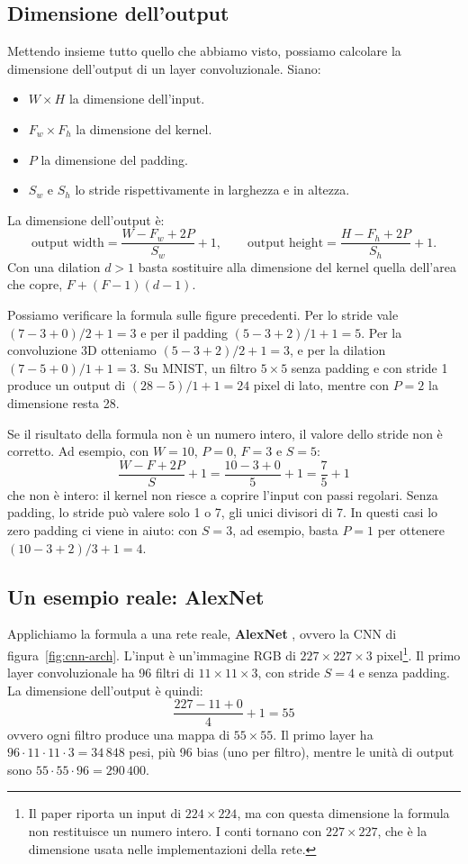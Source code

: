 \subsection{Dimensione dell'output}
Mettendo insieme tutto quello che abbiamo visto, possiamo calcolare la dimensione dell'output di un layer convoluzionale. Siano:
\begin{itemize}
    \item $W \times H$ la dimensione dell'input.
    \item $F_w \times F_h$ la dimensione del kernel.
    \item $P$ la dimensione del padding.
    \item $S_w$ e $S_h$ lo stride rispettivamente in larghezza e in altezza.
\end{itemize}
La dimensione dell'output è:
\[
\text{output width} = \frac{W - F_w + 2P}{S_w} + 1, \qquad \text{output height} = \frac{H - F_h + 2P}{S_h} + 1.
\]
Con una dilation $d > 1$ basta sostituire alla dimensione del kernel quella dell'area che copre, $F + (F - 1)(d - 1)$.

Possiamo verificare la formula sulle figure precedenti. Per lo stride vale $(7 - 3 + 0)/2 + 1 = 3$ e per il padding $(5 - 3 + 2)/1 + 1 = 5$. Per la convoluzione 3D otteniamo $(5 - 3 + 2)/2 + 1 = 3$, e per la dilation $(7 - 5 + 0)/1 + 1 = 3$. Su MNIST, un filtro $5 \times 5$ senza padding e con stride 1 produce un output di $(28 - 5)/1 + 1 = 24$ pixel di lato, mentre con $P = 2$ la dimensione resta 28.

\begin{osservazione}
Se il risultato della formula non è un numero intero, il valore dello stride non è corretto. Ad esempio, con $W = 10$, $P = 0$, $F = 3$ e $S = 5$:
\[
\frac{W - F + 2P}{S} + 1 = \frac{10 - 3 + 0}{5} + 1 = \frac{7}{5} + 1
\]
che non è intero: il kernel non riesce a coprire l'input con passi regolari. Senza padding, lo stride può valere solo 1 o 7, gli unici divisori di 7. In questi casi lo zero padding ci viene in aiuto: con $S = 3$, ad esempio, basta $P = 1$ per ottenere $(10 - 3 + 2)/3 + 1 = 4$.
\end{osservazione}

\subsection{Un esempio reale: AlexNet}\label{subsec:alexnet}
Applichiamo la formula a una rete reale, \textbf{AlexNet} \cite{Krizhevsky2012}, ovvero la CNN di figura~\ref{fig:cnn-arch}. L'input è un'immagine RGB di $227 \times 227 \times 3$ pixel\footnote{Il paper riporta un input di $224 \times 224$, ma con questa dimensione la formula non restituisce un numero intero. I conti tornano con $227 \times 227$, che è la dimensione usata nelle implementazioni della rete.}. Il primo layer convoluzionale ha 96 filtri di $11 \times 11 \times 3$, con stride $S = 4$ e senza padding. La dimensione dell'output è quindi:
\[
\frac{227 - 11 + 0}{4} + 1 = 55
\]
ovvero ogni filtro produce una mappa di $55 \times 55$. Il primo layer ha $96 \cdot 11 \cdot 11 \cdot 3 = 34\,848$ pesi, più 96 bias (uno per filtro), mentre le unità di output sono $55 \cdot 55 \cdot 96 = 290\,400$.

